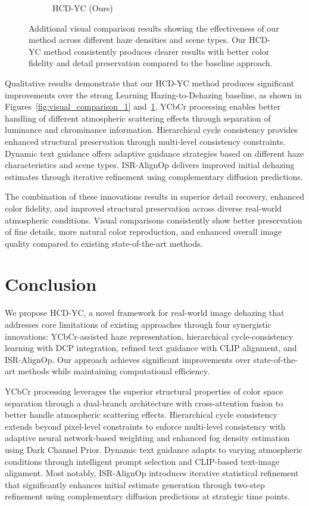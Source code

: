 \documentclass{article}
\begin{document}
\begin{figure}[t]
\begin{subfigure}[b]{0.32\textwidth}
    \caption{HCD-YC (Ours)}
\end{subfigure}
\caption{Additional visual comparison results showing the effectiveness of our method across different haze densities and scene types. Our HCD-YC method consistently produces clearer results with better color fidelity and detail preservation compared to the baseline approach.}
\label{fig:visual_comparison_2}
\end{figure}

Qualitative results demonstrate that our HCD-YC method produces significant improvements over the strong Learning Hazing-to-Dehazing baseline, as shown in Figures~\ref{fig:visual_comparison_1} and~\ref{fig:visual_comparison_2}. YCbCr processing enables better handling of different atmospheric scattering effects through separation of luminance and chrominance information. Hierarchical cycle consistency provides enhanced structural preservation through multi-level consistency constraints. Dynamic text guidance offers adaptive guidance strategies based on different haze characteristics and scene types. ISR-AlignOp delivers improved initial dehazing estimates through iterative refinement using complementary diffusion predictions.

The combination of these innovations results in superior detail recovery, enhanced color fidelity, and improved structural preservation across diverse real-world atmospheric conditions. Visual comparisons consistently show better preservation of fine details, more natural color reproduction, and enhanced overall image quality compared to existing state-of-the-art methods.

\section{Conclusion}

We propose HCD-YC, a novel framework for real-world image dehazing that addresses core limitations of existing approaches through four synergistic innovations: YCbCr-assisted haze representation, hierarchical cycle-consistency learning with DCP integration, refined text guidance with CLIP alignment, and ISR-AlignOp. Our approach achieves significant improvements over state-of-the-art methods while maintaining computational efficiency.

YCbCr processing leverages the superior structural properties of color space separation through a dual-branch architecture with cross-attention fusion to better handle atmospheric scattering effects. Hierarchical cycle consistency extends beyond pixel-level constraints to enforce multi-level consistency with adaptive neural network-based weighting and enhanced fog density estimation using Dark Channel Prior. Dynamic text guidance adapts to varying atmospheric conditions through intelligent prompt selection and CLIP-based text-image alignment. Most notably, ISR-AlignOp introduces iterative statistical refinement that significantly enhances initial estimate generation through two-step refinement using complementary diffusion predictions at strategic time points.
\end{document}
